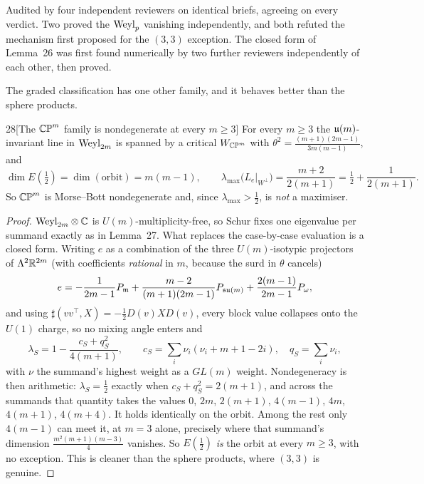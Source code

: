 \begin{certificate}
Audited by four independent reviewers on identical briefs, agreeing on every verdict. Two proved the $\mathrm{Weyl}_p$ vanishing independently, and both refuted the mechanism first proposed for the $(3,3)$ exception. The closed form of Lemma~26 was first found numerically by two further reviewers independently of each other, then proved.
\end{certificate}

The graded classification has one other family, and it behaves better than the sphere products.

\begin{Lem}{28}[The $\mathbb{CP}^m$ family is nondegenerate at every $m\ge3$]
For every $m\ge3$ the $\mathfrak{u}(m)$-invariant line in $\mathrm{Weyl}_{2m}$ is spanned by a critical $W_{\mathbb{CP}^m}$ with $\theta^2=\frac{(m+1)(2m-1)}{3m(m-1)}$, and
\[
\dim E(\tfrac12)=\dim(\text{orbit})=m(m-1),\qquad
\lambda_{\max}\big(L_e|_{W^\perp}\big)=\frac{m+2}{2(m+1)}=\tfrac12+\frac1{2(m+1)} .
\]
So $\mathbb{CP}^m$ is Morse--Bott nondegenerate and, since $\lambda_{\max}>\tfrac12$, is \emph{not} a maximiser.
\end{Lem}

\begin{proof}
$\mathrm{Weyl}_{2m}\otimes\mathbb C$ is $U(m)$-multiplicity-free, so Schur fixes one eigenvalue per summand exactly as in Lemma~27. What replaces the case-by-case evaluation is a closed form. Writing $e$ as a combination of the three $U(m)$-isotypic projectors of $\Lambda^2\mathbb{R}^{2m}$ (with coefficients \emph{rational} in $m$, because the surd in $\theta$ cancels)
\[
e=-\frac1{2m-1}P_{\mathfrak{m}}+\frac{m-2}{(m+1)(2m-1)}P_{\mathfrak{su}(m)}+\frac{2(m-1)}{2m-1}P_\omega ,
\]
and using $\sharp(vv^{\top},X)=-\tfrac12D(v)XD(v)$, every block value collapses onto the $U(1)$ charge, so no mixing angle enters and
\[
\lambda_S=1-\frac{c_S+q_S^2}{4(m+1)},\qquad c_S=\sum_i\nu_i(\nu_i+m+1-2i),\quad q_S=\sum_i\nu_i,
\]
with $\nu$ the summand's highest weight as a $GL(m)$ weight. Nondegeneracy is then arithmetic: $\lambda_S=\tfrac12$ exactly when $c_S+q_S^2=2(m+1)$, and across the summands that quantity takes the values $0$, $2m$, $2(m+1)$, $4(m-1)$, $4m$, $4(m+1)$, $4(m+4)$. It holds identically on the orbit. Among the rest only $4(m-1)$ can meet it, at $m=3$ alone, precisely where that summand's dimension $\tfrac{m^2(m+1)(m-3)}4$ vanishes. So $E(\tfrac12)$ \emph{is} the orbit at every $m\ge3$, with no exception. This is cleaner than the sphere products, where $(3,3)$ is genuine.
\end{proof}

